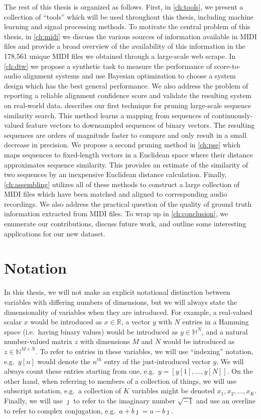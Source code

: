 The rest of this thesis is organized as follows.
First, in \cref{ch:tools}, we present a collection of ``tools'' which will be used throughout this thesis, including machine learning and signal processing methods.
To motivate the central problem of this thesis, in \cref{ch:midi} we discuss the various sources of information available in MIDI files and provide a broad overview of the availability of this information in the 178,561 unique MIDI files we obtained through a large-scale web scrape.
In \cref{ch:dtw} we propose a synthetic task to measure the performance of score-to-audio alignment systems and use Bayesian optimization to choose a system design which has the best general performance.
We also address the problem of reporting a reliable alignment confidence score and validate the resulting system on real-world data.
 describes our first technique for pruning large-scale sequence similarity search.
This method learns a mapping from sequences of continuously-valued feature vectors to downsampled sequences of binary vectors.
The resulting sequences are orders of magnitude faster to compare and only result in a small decrease in precision.
We propose a second pruning method in \cref{ch:pse} which maps sequences to fixed-length vectors in a Euclidean space where their distance approximates sequence similarity.
This provides an estimate of the similarity of two sequences by an inexpensive Euclidean distance calculation.
Finally, \cref{ch:assembling} utilizes all of these methods to construct a large collection of MIDI files which have been matched and aligned to corresponding audio recordings.
We also address the practical question of the quality of ground truth information extracted from MIDI files.
To wrap up in \cref{ch:conclusion}, we enumerate our contributions, discuss future work, and outline some interesting applications for our new dataset.

\section{Notation}

In this thesis, we will not make an explicit notational distinction between variables with differing numbers of dimensions, but we will always state the dimensionality of variables when they are introduced.
For example, a real-valued scalar $x$ would be introduced as $x \in \mathbb{R}$, a vector $y$ with $N$ entries in a Hamming space (i.e.\ having binary values) would be introduced as $y \in \mathbb{H}^N$, and a natural number-valued matrix $z$ with dimensions $M$ and $N$ would be introduced as $z \in \mathbb{N}^{M \times N}$.
To refer to entries in these variables, we will use ``indexing'' notation, e.g.\ $y[n]$ would denote the $n^{th}$ entry of the just-introduced vector $y$.
We will always count these entries starting from one, e.g.\ $y = [y[1], \ldots, y[N]]$.
On the other hand, when referring to members of a collection of things, we will use subscript notation, e.g.\ a collection of $K$ variables might be denoted $x_1, x_2, \ldots, x_K$.
Finally, we will use $\jmath$ to refer to the imaginary number $\sqrt{-1}$ and use an overline to refer to complex conjugation, e.g.\ $\overline{a + b\jmath} = a - b\jmath$.


